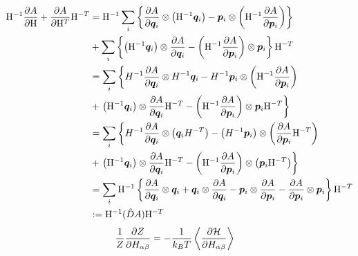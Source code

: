 \documentclass[11pt,a4paper,uplatex]{jsarticle}
\begin{document}
\begin{align}
    {\rm H}^{-1} \frac{\partial A}{\partial {\rm H}} + \frac{\partial A}{\partial {\rm H}^{T}}{\rm H}^{-T} 
    &= {\rm H}^{-1} \sum_{i}\left\{ 
      \frac{\partial A }{\partial \bm{q}_{i}} \otimes \left({\rm H}^{-1} \bm{q}_{i} \right) 
      - \bm{p}_{i} \otimes \left( {\rm H}^{-1} \frac{\partial A }{\partial \bm{p}_{i}} \right)
    \right\}\\
    &+ \sum_{i}  \left\{ \left({\rm H}^{-1} \bm{q}_{i} \right) \otimes \frac{\partial A }{\partial \bm{q}_{i}} 
        - \left( {\rm H}^{-1} \frac{\partial A }{\partial \bm{p}_{i}} \right) \otimes \bm{p}_{i} \right\}{\rm H}^{-T}  \\
    &= \sum_{i} \left\{ H^{-1} \frac{\partial A }{\partial \bm{q}_{i}} \otimes H^{-1} \bm{q}_{i} - H^{-1} \bm{p}_{i} \otimes \left( {\rm H}^{-1} \frac{\partial A }{\partial \bm{p}_{i}} \right) \right. \\
    &+ \left. \left({\rm H}^{-1} \bm{q}_{i}\right) \otimes \frac{\partial A }{\partial \bm{q}_{i}} 
     {\rm H}^{-T}   
    - \left( {\rm H}^{-1} \frac{\partial A }{\partial \bm{p}_{i}} \right) \otimes \bm{p}_{i} {\rm H}^{-T} \right\} \\
    &= \sum_{i}  \left\{ H^{-1} \frac{\partial A }{\partial \bm{q}_{i}} \otimes \left( \bm{q}_{i} H^{-T}\right) 
    - \left( H^{-1} \bm{p}_{i} \right) \otimes \left( \frac{\partial A }{\partial \bm{p}_{i}} {\rm H}^{-T} \right)  \right. \\
    &+ \left. \left({\rm H}^{-1} \bm{q}_{i} \right) \otimes \frac{\partial A }{\partial \bm{q}_{i}} 
    {\rm H}^{-T} 
    - \left( {\rm H}^{-1} \frac{\partial A }{\partial \bm{p}_{i}} \right) \otimes\left( \bm{p}_{i} {\rm H}^{-T} \right) \right\}\\
    &= \sum_{i} {\rm H}^{-1}  \left\{ \frac{\partial A }{\partial \bm{q}_{i}} \otimes \bm{q}_{i}
    + \bm{q}_{i} \otimes \frac{\partial A }{\partial \bm{q}_{i}} 
    - \bm{p}_{i} \otimes \frac{\partial A }{\partial \bm{p}_{i}} 
    - \frac{\partial A }{\partial \bm{p}_{i}} \otimes \bm{p}_{i} \right\}{\rm H}^{-T}\\
    &:= {\rm H}^{-1} (\hat{D} A) {\rm H}^{-T} 
\end{align}
\begin{align}
\frac{1}{Z}\frac{\partial Z}{\partial H_{\alpha \beta}} &= -\frac{1}{k_{B}T} \left< \frac{\partial {\cal H}}{\partial H_{\alpha \beta}}\right>
\end{align}
\end{document}
